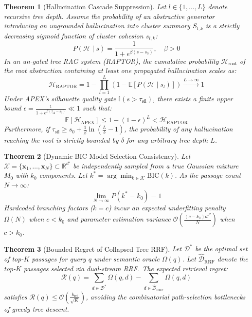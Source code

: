 \documentclass[11pt,a4paper]{article}
\newtheorem{theorem}{Theorem}
\begin{document}
\begin{theorem}[Hallucination Cascade Suppression]
\label{thm:hallucination_suppression}
Let $l \in \{1, \dots, L\}$ denote recursive tree depth. Assume the probability of an abstractive generator introducing an ungrounded hallucination into cluster summary $S_{l,k}$ is a strictly decreasing sigmoid function of cluster cohesion $s_{l,k}$:
\begin{equation}
    P(\mathcal{H} \mid s) = \frac{1}{1 + e^{\beta (s - s_0)}}, \quad \beta > 0
\end{equation}
In an un-gated tree RAG system (RAPTOR), the cumulative probability $\mathcal{H}_{\text{root}}$ of the root abstraction containing at least one propagated hallucination scales as:
\begin{equation}
    \mathcal{H}_{\text{RAPTOR}} = 1 - \prod_{l=1}^L \left(1 - \mathbb{E}[P(\mathcal{H} \mid s_l)]\right) \xrightarrow{L \to \infty} 1
\end{equation}
Under APEX's silhouette quality gate $\mathbb{I}(s > \tau_{\text{sil}})$, there exists a finite upper bound $\epsilon = \frac{1}{1 + e^{\beta(\tau_{\text{sil}} - s_0)}} \ll 1$ such that:
\begin{equation}
    \mathbb{E}[\mathcal{H}_{\text{APEX}}] \le 1 - (1 - \epsilon)^L < \mathcal{H}_{\text{RAPTOR}}
\end{equation}
Furthermore, if $\tau_{\text{sil}} \ge s_0 + \frac{1}{\beta} \ln\left(\frac{L}{\delta} - 1\right)$, the probability of any hallucination reaching the root is strictly bounded by $\delta$ for any arbitrary tree depth $L$.
\end{theorem}

\begin{theorem}[Dynamic BIC Model Selection Consistency]
\label{thm:bic_consistency}
Let $\mathcal{X} = \{\mathbf{x}_1, \dots, \mathbf{x}_N\} \subset \mathbb{R}^{d'}$ be independently sampled from a true Gaussian mixture $M_0$ with $k_0$ components. Let $k^* = \arg\min_{k \in \mathcal{K}} \text{BIC}(k)$. As the passage count $N \to \infty$:
\begin{equation}
    \lim_{N \to \infty} P(k^* = k_0) = 1
\end{equation}
Hardcoded branching factors ($k=c$) incur an expected underfitting penalty $\Omega(N)$ when $c < k_0$ and parameter estimation variance $\mathcal{O}\left(\frac{(c - k_0) d'^2}{N}\right)$ when $c > k_0$.
\end{theorem}

\begin{theorem}[Bounded Regret of Collapsed Tree RRF]
\label{thm:rrf_regret}
Let $\mathcal{D}^*$ be the optimal set of top-$K$ passages for query $q$ under semantic oracle $\Omega(q)$. Let $\hat{\mathcal{D}}_{\text{RRF}}$ denote the top-$K$ passages selected via dual-stream RRF. The expected retrieval regret:
\begin{equation}
    \mathcal{R}(q) = \sum_{d \in \mathcal{D}^*} \Omega(q, d) - \sum_{d \in \hat{\mathcal{D}}_{\text{RRF}}} \Omega(q, d)
\end{equation}
satisfies $\mathcal{R}(q) \le \mathcal{O}\left(\frac{k_{\text{rrf}}}{\sqrt{K}}\right)$, avoiding the combinatorial path-selection bottlenecks of greedy tree descent.
\end{theorem}
\end{document}
